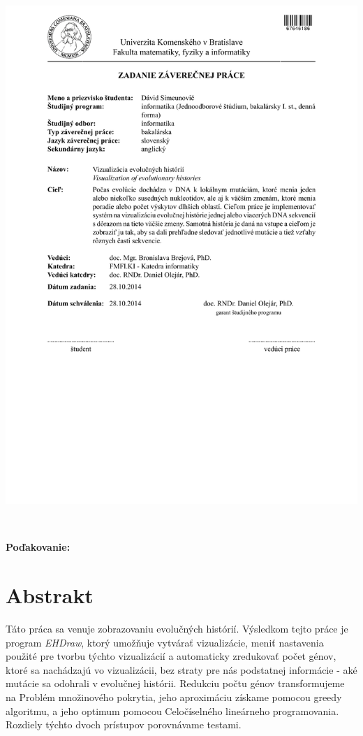 \documentclass[12pt,oneside]{book}
\begin{document}
\newpage 
\thispagestyle{empty}
\hspace{-2cm}\includegraphics[width=1.1\textwidth]{images/zadanie}


\frontmatter

\setcounter{page}{3}
\newpage 
~

\vfill
{\bf Poďakovanie:}



\newpage 
\section*{Abstrakt}

Táto práca sa venuje zobrazovaniu evolučných histórií. 
Výsledkom tejto práce je program \emph{EHDraw}, ktorý umožňuje vytvárať vizualizácie, 
meniť nastavenia použité pre tvorbu týchto vizualizácií a automaticky zredukovať počet génov, ktoré sa nachádzajú vo vizualizácii,
bez straty pre nás podstatnej informácie - aké mutácie sa odohrali v evolučnej histórii. 
Redukciu počtu génov transformujeme na Problém množinového pokrytia, jeho aproximáciu získame pomocou greedy algoritmu,
a jeho optimum pomocou Celočíselného lineárneho programovania. 
Rozdiely týchto dvoch prístupov porovnávame testami.
\end{document}
